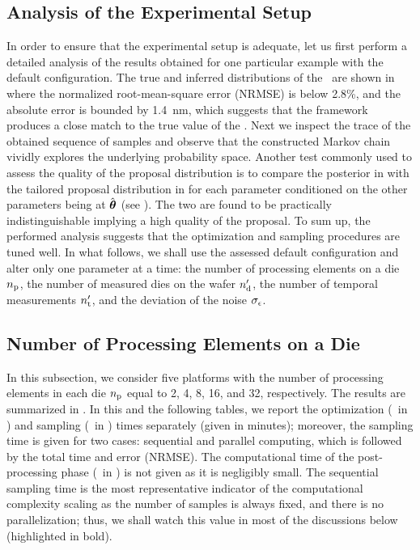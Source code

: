 \subsection{Analysis of the Experimental Setup}
In order to ensure that the experimental setup is adequate, let us first perform a detailed analysis of the results obtained for one particular example with the default configuration.
The true and inferred distributions of the \qoi\ are shown in  where the normalized root-mean-square error (NRMSE) is below 2.8\%, and the absolute error is bounded by 1.4~nm, which suggests that the framework produces a close match to the true value of the \qoi.
Next we inspect the trace of the obtained sequence of samples and observe that the constructed Markov chain vividly explores the underlying probability space.
Another test commonly used to assess the quality of the proposal distribution is to compare the posterior in  with the tailored proposal distribution in  for each parameter conditioned on the other parameters being at $\hat{{\boldsymbol\theta}}$ (see ).
The two are found to be practically indistinguishable implying a high quality of the proposal.
To sum up, the performed analysis suggests that the optimization and sampling procedures are tuned well.
In what follows, we shall use the assessed default configuration and alter only one parameter at a time: the number of processing elements on a die ${n_\text{p}}$, the number of measured dies on the wafer ${n_\text{d}'}$, the number of temporal measurements ${n_\text{t}'}$, and the deviation of the noise $\sigma_\epsilon$.

\subsection{Number of Processing Elements on a Die}
In this subsection, we consider five platforms with the number of processing elements in each die ${n_\text{p}}$ equal to 2, 4, 8, 16, and 32, respectively. The results are summarized in .
In this and the following tables, we report the optimization (\ in ) and sampling (\ in ) times separately (given in minutes); moreover, the sampling time is given for two cases: sequential and parallel computing, which is followed by the total time and error (NRMSE).
The computational time of the post-processing phase (\ in ) is not given as it is negligibly small.
The sequential sampling time is the most representative indicator of the computational complexity scaling as the number of samples is always fixed, and there is no parallelization; thus, we shall watch this value in most of the discussions below (highlighted in bold).

